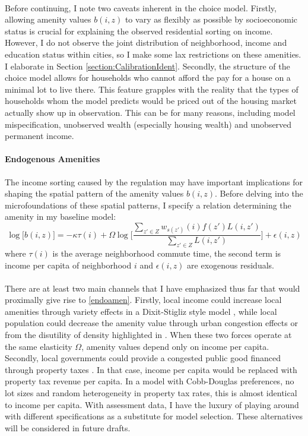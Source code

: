 \documentclass[]{article}
\begin{document}
\paragraph*{}
Before continuing, I note two caveats inherent in the choice model. Firstly, allowing amenity values $b(i, z)$ to vary as flexibly as possible by socioeconomic status is crucial for explaining the observed residential sorting on income. However, I do not observe the joint distribution of neighborhood, income and education status within cities, so I make some lax restrictions on these amenities. I elaborate in Section \ref{section:CalibrationIdent}. Secondly, the structure of the choice model allows for households who cannot afford the pay for a house on a minimal lot to live there. This feature grapples with the reality that the types of households whom the model predicts would be priced out of the housing market actually show up in observation. This can be for many reasons, including model mispecification, unobserved wealth (especially housing wealth) and unobserved permanent income.

 \paragraph*{Endogenous Amenities} 
 The income sorting caused by the regulation may have important implications for shaping the spatial pattern of the amenity values $b(i, z)$. Before delving into the microfoundations of these spatial patterns, I specify a relation determining the amenity in my baseline model:
 \begin{equation}\label{endoamen}
 	\log\big[b(i, z)\big] = -\kappa\tau(i) + \Omega\log\bigg[\frac{\sum_{z' \in Z}w_{s(z')}(i)f(z')L(i, z')}{\sum_{z' \in Z}L(i, z')}\bigg] + \epsilon(i, z)
 \end{equation}
 where $\tau(i)$ is the average neighborhood commute time, the second term is income per capita of neighborhood $i$ and $\epsilon(i, z)$ are exogenous residuals. 
 \paragraph*{}
 There are at least two main channels that I have emphasized thus far that would proximally give rise to \eqref{endoamen}. Firstly, local income could increase local amenities through variety effects in a Dixit-Stigliz style model \citep{AlmagroDI} \citep{Coutureetal}, while local population could decrease the amenity value through urban congestion effects or from the disutility of density highlighted in \citep{KSC}. When these two forces operate at the same elasticity $\Omega$, amenity values depend only on income per capita. Secondly, local governments could provide a congested public good financed through property taxes \citep{calabresetal}. In that case, income per capita would be replaced with property tax revenue per capita. In a model with Cobb-Douglas preferences, no lot sizes and random heterogeneity in property tax rates, this is almost identical to income per capita. With assessment data, I have the luxury of playing around with different specifications as a substitute for model selection. These alternatives will be considered in future drafts. 
 
\end{document}
